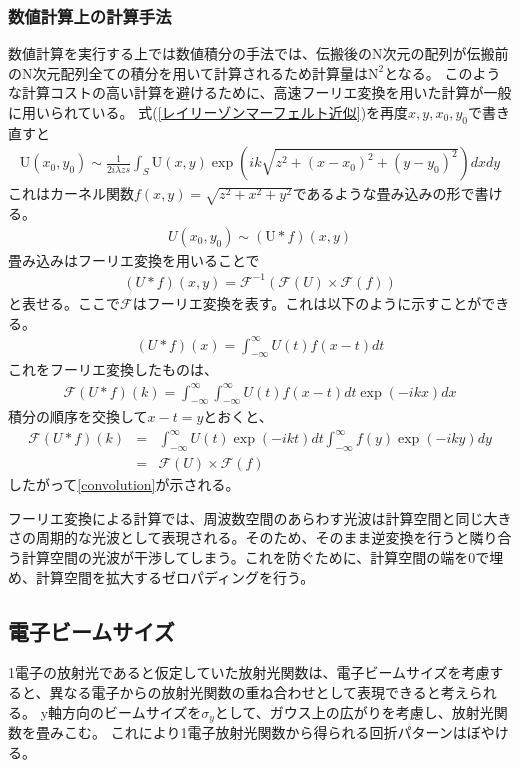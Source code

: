 \documentclass[a4paper,11pt,uplatex]{jsbook}
\begin{document}
\subsubsection{数値計算上の計算手法}
数値計算を実行する上では数値積分の手法では、伝搬後のN次元の配列が伝搬前のN次元配列全ての積分を用いて計算されるため計算量は$\text{N}^2$となる。
このような計算コストの高い計算を避けるために、高速フーリエ変換を用いた計算が一般に用いられている。
式(\ref{レイリーゾンマーフェルト近似})を再度$x,y,x_0,y_0$で書き直すと
\begin{eqnarray}
  \text{U}(x_0,y_0) \sim \frac{1}{2i\lambda zs}\int_S \text{U}(x,y) \exp( ik \sqrt{z^2 + (x-x_0)^2 + (y-y_0)^2}) dxdy
\end{eqnarray}
これはカーネル関数$f(x,y) = \sqrt{z^2 +x^2 + y^2}$であるような畳み込みの形で書ける。
\begin{eqnarray}
  U(x_0,y_0) \sim (\text{U} * f)(x,y)
\end{eqnarray}
畳み込みはフーリエ変換を用いることで
\begin{eqnarray}
  (U*f)(x,y) = \mathcal{F}^{-1}(\mathcal{F}(U) \times \mathcal{F}(f)) \label{convolution}
\end{eqnarray}
と表せる。ここで$\mathcal{F}$はフーリエ変換を表す。これは以下のように示すことができる。
\begin{eqnarray}
  (U*f)(x) = \int_{-\infty}^{\infty} U(t)f(x-t)dt
\end{eqnarray}
これをフーリエ変換したものは、
\begin{eqnarray}
  \mathcal{F}(U*f)(k) = \int_{-\infty}^{\infty} \int_{-\infty}^{\infty} U(t)f(x-t)dt \exp(-ikx)dx
\end{eqnarray}
積分の順序を交換して$x-t = y$とおくと、
\begin{eqnarray}
  \mathcal{F}(U*f)(k) &=& \int_{-\infty}^{\infty} U(t) \exp(-ikt)dt \int_{-\infty}^{\infty} f(y) \exp(-iky)dy\\
  &=& \mathcal{F}(U) \times \mathcal{F}(f)
\end{eqnarray}
したがって\ref{convolution}が示される。

フーリエ変換による計算では、周波数空間のあらわす光波は計算空間と同じ大きさの周期的な光波として表現される。そのため、そのまま逆変換を行うと隣り合う計算空間の光波が干渉してしまう。これを防ぐために、計算空間の端を0で埋め、計算空間を拡大するゼロパディングを行う。

\subsection{電子ビームサイズ}
1電子の放射光であると仮定していた放射光関数は、電子ビームサイズを考慮すると、異なる電子からの放射光関数の重ね合わせとして表現できると考えられる。
y軸方向のビームサイズを$\sigma_y$として、ガウス上の広がりを考慮し、放射光関数を畳みこむ。
これにより1電子放射光関数から得られる回折パターンはぼやける。
\end{document}
